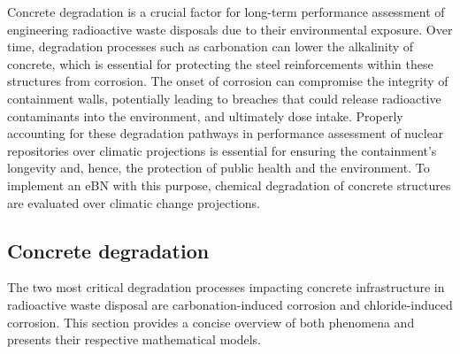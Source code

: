 
Concrete degradation is a crucial factor for long-term performance assessment of engineering radioactive waste disposals due to their environmental exposure. Over time, degradation processes such as carbonation can lower the alkalinity of concrete, which is essential for protecting the steel reinforcements within these structures from corrosion.
The onset of corrosion can compromise the integrity of containment walls, potentially leading to breaches that could release radioactive contaminants into the environment, and ultimately dose intake.
Properly accounting for these degradation pathways in performance assessment of nuclear repositories over climatic projections is essential for ensuring the containment's longevity and, hence, the protection of public health and the environment. To implement an eBN with this purpose, chemical degradation of concrete structures are evaluated over climatic change projections. 

\subsection{Concrete degradation}
The two most critical degradation processes impacting concrete infrastructure in radioactive waste disposal are carbonation-induced corrosion and chloride-induced corrosion. This section provides a concise overview of both phenomena and presents their respective mathematical models.

